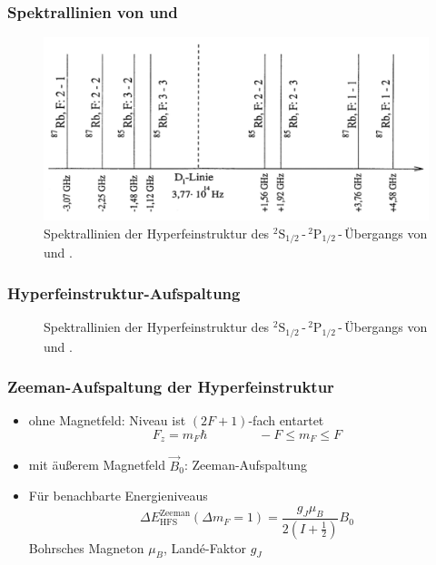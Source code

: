\begin{frame}
\frametitle{Spektrallinien von  und }
\begin{figure}
    \centering
    \includegraphics[width=\textwidth]{../img/HFSspect_theo.png}
    \caption{Spektrallinien der Hyperfeinstruktur des ${}^2\text{S}_{1/2}$\,-\,${}^2\text{P}_{1/2}$\,-\,Übergangs
    von  und .}  %
\end{figure}
\end{frame}


\begin{frame}
\frametitle{Hyperfeinstruktur-Aufspaltung}

\begin{figure}
    \centering
    \def\svgwidth{\textwidth}
    
    \caption{Spektrallinien der Hyperfeinstruktur des ${}^2\text{S}_{1/2}$\,-\,${}^2\text{P}_{1/2}$\,-\,Übergangs
    von  und .}
\end{figure}

\end{frame}

\begin{frame}
\frametitle{Zeeman-Aufspaltung der Hyperfeinstruktur}
\begin{itemize}
    \item<1-> ohne Magnetfeld: Niveau ist $(2F+1)$-fach entartet
    \begin{equation*}
        F_z = m_F \hbar \qquad \qquad -F \leq m_F \leq F
    \end{equation*}
    \item<2-> mit äußerem Magnetfeld $\vec{B}_0$: Zeeman-Aufspaltung
    \item<3-> Für benachbarte Energieniveaus
    \begin{equation*}
        \Delta E_\text{HFS}^\text{Zeeman}(\Delta m_F = 1) = \frac{g_J \mu_B}{2 \left( I + \frac{1}{2} \right) } B_0
    \end{equation*}
    Bohrsches Magneton $\mu_B$, Landé-Faktor $g_J$
\end{itemize}
\end{frame}

